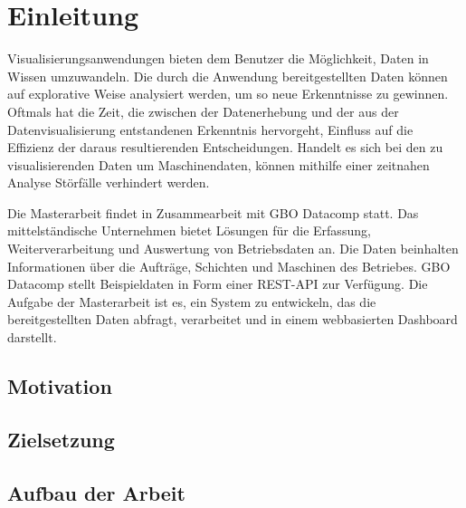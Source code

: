 \chapter{Einleitung}
\label{chap:einleitung}
Visualisierungsanwendungen bieten dem Benutzer die Möglichkeit,
Daten in Wissen umzuwandeln. Die durch die Anwendung bereitgestellten
Daten können auf explorative Weise analysiert werden, um so neue
Erkenntnisse zu gewinnen. Oftmals hat die Zeit, die zwischen der 
Datenerhebung und der aus der Datenvisualisierung entstandenen Erkenntnis
hervorgeht, Einfluss auf die Effizienz der daraus resultierenden Entscheidungen.
Handelt es sich bei den zu visualisierenden Daten um Maschinendaten,
können mithilfe einer zeitnahen Analyse Störfälle verhindert werden.

Die Masterarbeit findet in Zusammearbeit mit GBO Datacomp statt.
Das mittelständische Unternehmen bietet Lösungen für die Erfassung,
Weiterverarbeitung und Auswertung von Betriebsdaten an. Die Daten
beinhalten Informationen über die Aufträge, Schichten und Maschinen
des Betriebes. GBO Datacomp stellt Beispieldaten in Form einer REST-API
zur Verfügung. Die Aufgabe der Masterarbeit ist es, ein System zu entwickeln, das die 
bereitgestellten Daten abfragt, verarbeitet und in einem webbasierten Dashboard
darstellt.

\section{Motivation}
\label{sec:motivation}


\section{Zielsetzung}
\label{sec:zielsetzung}

\section{Aufbau der Arbeit}
\label{sec:aufbauderarbeit}




